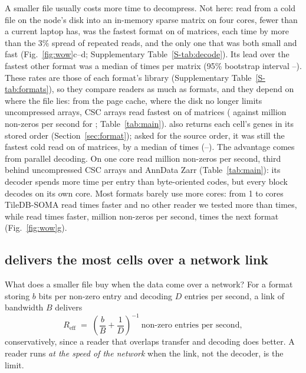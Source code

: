 A smaller file usually costs more time to decompress. Not here: read from a cold file on the node's disk into an
in-memory sparse matrix on four cores, fewer than a current laptop has, \sone{} was the fastest format on
 of  matrices, each time by more than the 3\% spread of repeated reads, and the
only one that was both small and fast (Fig.~\ref{fig:wow}c--d; Supplementary Table~\ref{S-tab:decode}). Its lead over the
fastest other format was a median of  times per matrix (95\% bootstrap interval
--). These rates are those of each format's library (Supplementary
Table~\ref{S-tab:formats}), so they compare readers as much as formats, and they depend on where the file lies: from the
page cache, where the disk no longer limits uncompressed arrays, CSC arrays read fastest on  of
 matrices ( against  million non-zeros per second for \sone;
Table~\ref{tab:main}). \sone{} also returns each cell's genes in its stored order (Section~\ref{sec:format}); asked for
the source order, it was still the fastest cold read on  of  matrices, by a median
of  times (--). The advantage comes from parallel decoding. On one core \sone{} read  million non-zeros per second, third behind uncompressed
CSC arrays and AnnData Zarr (Table~\ref{tab:main}): its decoder spends more time per entry than byte-oriented codes, but
every block decodes on its own core. Most formats barely use more cores: from 1 to  cores TileDB-SOMA read
 times faster and no other reader we tested more than  times, while \sone{} read
 times faster,  million non-zeros per second,  times the next format
(Fig.~\ref{fig:wow}g).

\subsection{\sone{} delivers the most cells over a network link}
\label{sec:network}

What does a smaller file buy when the data come over a network? For a format storing $b$ bits per non-zero entry and
decoding $D$ entries per second, a link of bandwidth $B$ delivers
\begin{equation}
R_{\mathrm{eff}} \;=\; \left(\frac{b}{B} + \frac{1}{D}\right)^{-1}\ \text{non-zero entries per second},
\label{eq:reff}
\end{equation}
conservatively, since a reader that overlaps transfer and decoding does better. A reader runs \emph{at the speed of the
network} when the link, not the decoder, is the limit.

